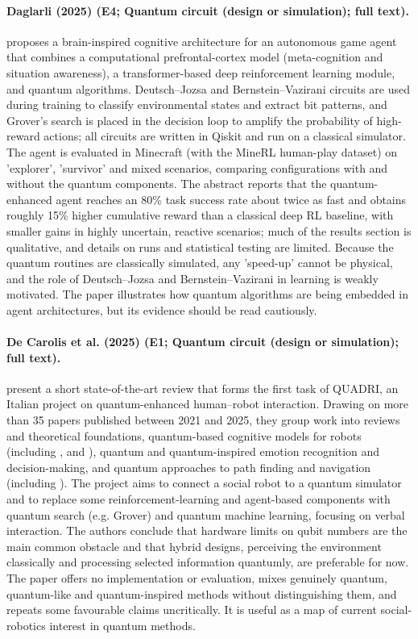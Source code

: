\documentclass[10pt,a4paper]{article}
\begin{document}
\paragraph{Daglarli (2025) (E4; Quantum circuit (design or simulation); full text).} \citet{Daglarli2025} proposes a brain-inspired cognitive architecture for an autonomous game agent that combines a computational prefrontal-cortex model (meta-cognition and situation awareness), a transformer-based deep reinforcement learning module, and quantum algorithms. Deutsch--Jozsa and Bernstein--Vazirani circuits are used during training to classify environmental states and extract bit patterns, and Grover's search is placed in the decision loop to amplify the probability of high-reward actions; all circuits are written in Qiskit and run on a classical simulator. The agent is evaluated in Minecraft (with the MineRL human-play dataset) on 'explorer', 'survivor' and mixed scenarios, comparing configurations with and without the quantum components. The abstract reports that the quantum-enhanced agent reaches an 80\% task success rate about twice as fast and obtains roughly 15\% higher cumulative reward than a classical deep RL baseline, with smaller gains in highly uncertain, reactive scenarios; much of the results section is qualitative, and details on runs and statistical testing are limited. Because the quantum routines are classically simulated, any 'speed-up' cannot be physical, and the role of Deutsch--Jozsa and Bernstein--Vazirani in learning is weakly motivated. The paper illustrates how quantum algorithms are being embedded in agent architectures, but its evidence should be read cautiously.

\paragraph{De Carolis et al. (2025) (E1; Quantum circuit (design or simulation); full text).} \citet{DeCarolis2025} present a short state-of-the-art review that forms the first task of QUADRI, an Italian project on quantum-enhanced human--robot interaction. Drawing on more than 35 papers published between 2021 and 2025, they group work into reviews and theoretical foundations, quantum-based cognitive models for robots (including \citep{Ho2022}, \citep{Mannone2024} and \citep{Widdows2023}), quantum and quantum-inspired emotion recognition and decision-making, and quantum approaches to path finding and navigation (including \citep{Hohenfeld2024}). The project aims to connect a social robot to a quantum simulator and to replace some reinforcement-learning and agent-based components with quantum search (e.g. Grover) and quantum machine learning, focusing on verbal interaction. The authors conclude that hardware limits on qubit numbers are the main common obstacle and that hybrid designs, perceiving the environment classically and processing selected information quantumly, are preferable for now. The paper offers no implementation or evaluation, mixes genuinely quantum, quantum-like and quantum-inspired methods without distinguishing them, and repeats some favourable claims uncritically. It is useful as a map of current social-robotics interest in quantum methods.
\end{document}
